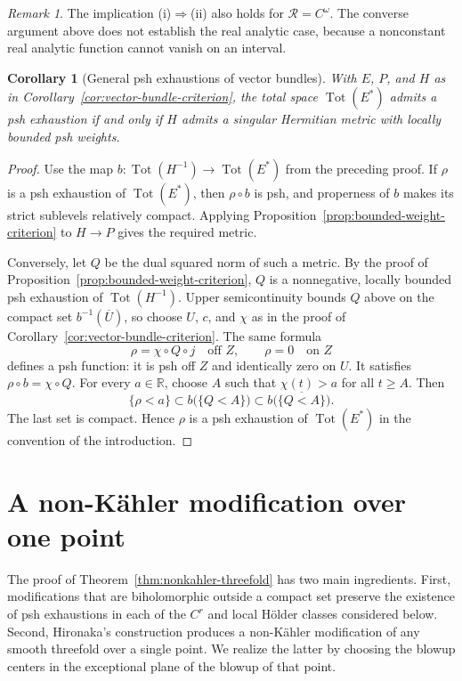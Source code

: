 \documentclass[11pt]{amsart}
\newtheorem{corollary}[theorem]{Corollary}
\theoremstyle{definition}
\theoremstyle{remark}
\newtheorem{remark}{Remark}[section]
\numberwithin{equation}{section}
\newcommand{\R}{\mathbb R}
\newcommand{\Tot}{\operatorname{Tot}}
\begin{document}
\begin{remark}
The implication \textup{(i)}$\Rightarrow$\textup{(ii)} also
holds for $\mathcal R=C^\omega$. The converse argument
above does not establish the real analytic case, because
a nonconstant real analytic function cannot vanish on
an interval.
\end{remark}

\begin{corollary}[General psh exhaustions of vector bundles]
\label{cor:vector-bundle-bounded-weights}
With $E$, $P$, and $H$ as in
Corollary~\ref{cor:vector-bundle-criterion}, the total space
$\Tot(E^*)$ admits a psh exhaustion if and only if $H$
admits a singular Hermitian metric with locally bounded
psh weights.
\end{corollary}

\begin{proof}
Use the map $b:\Tot(H^{-1})\to\Tot(E^*)$ from the preceding
proof. If $\rho$ is a psh exhaustion of $\Tot(E^*)$, then
$\rho\circ b$ is psh, and properness of $b$ makes its
strict sublevels relatively compact. Applying
Proposition~\ref{prop:bounded-weight-criterion} to $H\to P$
gives the required metric.

Conversely, let $Q$ be the dual squared norm of such a metric.
By the proof of Proposition~\ref{prop:bounded-weight-criterion},
$Q$ is a nonnegative, locally bounded psh exhaustion of
$\Tot(H^{-1})$. Upper
semicontinuity bounds $Q$ above on the compact set
$b^{-1}(\overline U)$, so choose $U$, $c$, and $\chi$ as
in the proof of Corollary~\ref{cor:vector-bundle-criterion}.
The same formula
\[
 \rho=\chi\circ Q\circ j\quad\text{off }Z,
 \qquad \rho=0\quad\text{on }Z
\]
defines a psh function: it is psh off $Z$ and identically
zero on $U$. It satisfies $\rho\circ b=\chi\circ Q$.
For every $a\in\R$, choose $A$ such that $\chi(t)>a$
for all $t\ge A$. Then
\[
 \{\rho<a\}\subset b\bigl(\{Q<A\}\bigr)
 \subset b\bigl(\overline{\{Q<A\}}\bigr).
\]
The last set is compact. Hence $\rho$ is a psh exhaustion
of $\Tot(E^*)$ in the convention of the introduction.
\end{proof}

\section{A non-K\"ahler modification over one point}\label{sec:nonkahler}

The proof of Theorem~\ref{thm:nonkahler-threefold} has two main ingredients.
First, modifications that are biholomorphic outside a
compact set preserve the existence of psh exhaustions in each of the
$C^r$ and local H\"older classes considered below. Second, Hironaka's
construction produces a non-K\"ahler modification of any smooth
threefold over a single point. We realize the latter by choosing the
blowup centers in the exceptional plane of the blowup of that point.
\end{document}
